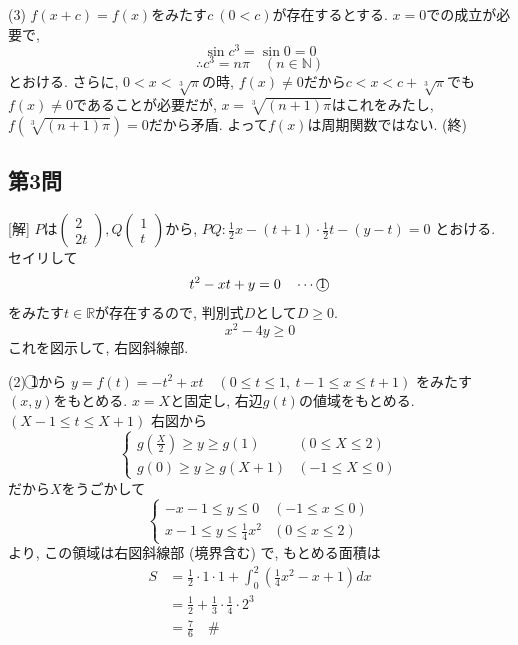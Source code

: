 \documentclass[../main.tex]{subfiles}
\begin{document}
(3) $f(x+c) = f(x)$をみたす$c \ (0 < c)$が存在するとする. $x=0$での成立が必要で,
$$ \sin c^3 = \sin 0 = 0 $$
$$ \therefore c^3 = n\pi \quad (n \in \mathbb{N}) $$
とおける. さらに, $0 < x < \sqrt[3]{\pi}$の時, $f(x) \neq 0$だから$c < x < c + \sqrt[3]{\pi}$でも$f(x) \neq 0$であることが必要だが, $x = \sqrt[3]{(n+1)\pi}$はこれをみたし, $f(\sqrt[3]{(n+1)\pi}) = 0$だから矛盾. よって$f(x)$は周期関数ではない. \hfill (終)

\subsection*{第3問}
[解] $P$は$
\begin{pmatrix} 2 \\ 2t
\end{pmatrix}, Q
\begin{pmatrix} 1 \\ t
\end{pmatrix}$から,
$PQ : \frac{1}{2}x - (t+1)\cdot\frac{1}{2}t - (y-t) = 0$
とおける. セイリして
$$ t^2 - xt + y = 0 \quad \cdots \text{\textcircled{1}} $$
をみたす$t \in \mathbb{R}$が存在するので, 判別式$D$として$D \ge 0$.
$$ x^2 - 4y \ge 0 $$
これを図示して, 右図斜線部.
\begin{center}
\end{center}

(2) \textcircled{1}から
$y = f(t) = -t^2 + xt \quad (0 \le t \le 1, \ t-1 \le x \le t+1)$
をみたす$(x,y)$をもとめる. $x=X$と固定し, 右辺$g(t)$の値域をもとめる. $(X-1 \le t \le X+1)$ 右図から
$$
\begin{cases}
  g\left(\frac{X}{2}\right) \ge y \ge g(1) & (0 \le X \le 2) \\
  g(0) \ge y \ge g(X+1) & (-1 \le X \le 0)
\end{cases}
$$
だから$X$をうごかして
$$
\begin{cases}
  -x-1 \le y \le 0 & (-1 \le x \le 0) \\
  x-1 \le y \le \frac{1}{4}x^2 & (0 \le x \le 2)
\end{cases}
$$
より, この領域は右図斜線部 (境界含む) で, もとめる面積は
\begin{align*}
  S &= \frac{1}{2} \cdot 1 \cdot 1 + \int_0^2 \left(\frac{1}{4}x^2 - x + 1\right) dx \\
  &= \frac{1}{2} + \frac{1}{3} \cdot \frac{1}{4} \cdot 2^3 \\
  &= \frac{7}{6} \quad \text{\#}
\end{align*}
\end{document}
